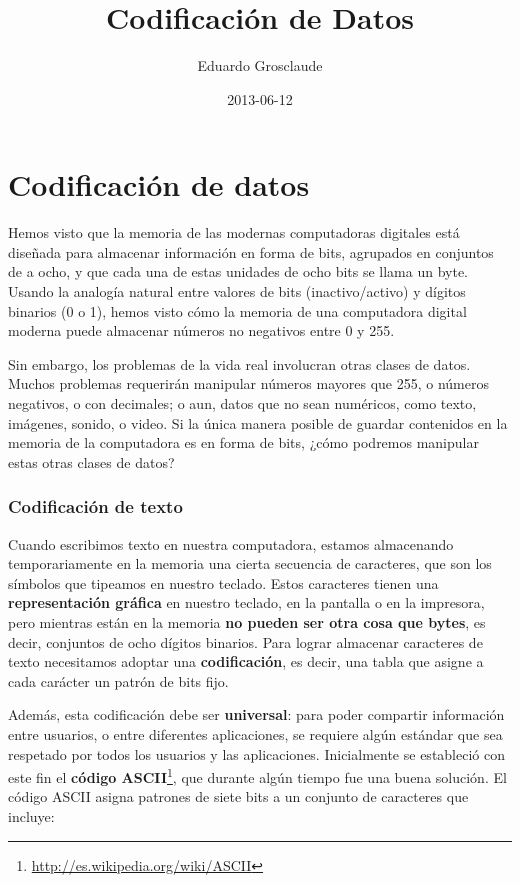 \documentclass[a4paper]{article}
\title{Codificación de Datos}
\author{Eduardo Grosclaude}
\date{2013-06-12}
\begin{document}
\section{Codificación de datos}
Hemos visto que la memoria de las modernas computadoras digitales está
diseñada para almacenar información en forma de bits, agrupados en
conjuntos de a ocho, y que cada una de estas unidades de ocho bits se
llama un byte. Usando la analogía natural entre valores de bits
(inactivo/activo) y dígitos binarios (0 o 1), hemos visto cómo la
memoria de una computadora digital moderna puede almacenar números no
negativos entre 0 y 255.

Sin embargo, los problemas de la vida real involucran otras clases de
datos. Muchos problemas requerirán manipular números mayores que
255, o números negativos, o con decimales; o aun, datos que no sean
numéricos, como texto, imágenes, sonido, o video. Si la única
manera posible de guardar contenidos en la memoria de la computadora es
en forma de bits, ¿cómo podremos manipular estas otras clases de
datos?

\subsubsection{Codificación de texto}
Cuando escribimos texto en nuestra computadora, estamos almacenando
temporariamente en la memoria una cierta secuencia de caracteres, que
son los símbolos que tipeamos en nuestro teclado. Estos caracteres
tienen una \textbf{representación gráfica} en nuestro teclado, en
la pantalla o en la impresora, pero mientras están en la memoria
\textbf{no pueden ser otra cosa que bytes}, es decir, conjuntos de ocho
dígitos binarios. Para lograr almacenar caracteres de texto
necesitamos adoptar una \textbf{codificación}, es decir, una tabla
que asigne a cada carácter un patrón de bits fijo.

Además, esta codificación debe ser \textbf{universal}: para poder
compartir información entre usuarios, o entre diferentes
aplicaciones, se requiere algún estándar que sea respetado por
todos los usuarios y las aplicaciones. Inicialmente se estableció con
este fin el \textbf{código
ASCII}\footnote{\url{http://es.wikipedia.org/wiki/ASCII}}, que durante
algún tiempo fue una buena solución. El código ASCII asigna
patrones de siete bits a un conjunto de caracteres que incluye:
\end{document}
